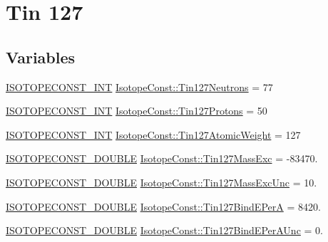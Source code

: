\hypertarget{group___isotope_const-_tin-_sn127}{}\section{Tin 127}
\label{group___isotope_const-_tin-_sn127}
\subsection*{Variables}
\begin{DoxyCompactItemize}
\item 
\mbox{\hyperlink{group___isotope_const-_macros_ga5f18360b3e99483a35c32d789e62621c}{I\+S\+O\+T\+O\+P\+E\+C\+O\+N\+S\+T\+\_\+\+I\+NT}} \mbox{\hyperlink{group___isotope_const-_tin-_sn127_ga81f1b0bce1cccc58d281ed7a2bd7276e}{Isotope\+Const\+::\+Tin127\+Neutrons}} = 77
\item 
\mbox{\hyperlink{group___isotope_const-_macros_ga5f18360b3e99483a35c32d789e62621c}{I\+S\+O\+T\+O\+P\+E\+C\+O\+N\+S\+T\+\_\+\+I\+NT}} \mbox{\hyperlink{group___isotope_const-_tin-_sn127_gae1f20228102f5a677f08bf3c593258c4}{Isotope\+Const\+::\+Tin127\+Protons}} = 50
\item 
\mbox{\hyperlink{group___isotope_const-_macros_ga5f18360b3e99483a35c32d789e62621c}{I\+S\+O\+T\+O\+P\+E\+C\+O\+N\+S\+T\+\_\+\+I\+NT}} \mbox{\hyperlink{group___isotope_const-_tin-_sn127_gaec65ac4d6ffe000b185ed8d26ee21496}{Isotope\+Const\+::\+Tin127\+Atomic\+Weight}} = 127
\item 
\mbox{\hyperlink{group___isotope_const-_macros_ga8f45a7272ce02c0b4c65c44636ed719a}{I\+S\+O\+T\+O\+P\+E\+C\+O\+N\+S\+T\+\_\+\+D\+O\+U\+B\+LE}} \mbox{\hyperlink{group___isotope_const-_tin-_sn127_ga203894618ec16a3ec907ee598004c489}{Isotope\+Const\+::\+Tin127\+Mass\+Exc}} = -\/83470.
\item 
\mbox{\hyperlink{group___isotope_const-_macros_ga8f45a7272ce02c0b4c65c44636ed719a}{I\+S\+O\+T\+O\+P\+E\+C\+O\+N\+S\+T\+\_\+\+D\+O\+U\+B\+LE}} \mbox{\hyperlink{group___isotope_const-_tin-_sn127_ga223b64a9a1fed5db23e75452f06ca7f2}{Isotope\+Const\+::\+Tin127\+Mass\+Exc\+Unc}} = 10.
\item 
\mbox{\hyperlink{group___isotope_const-_macros_ga8f45a7272ce02c0b4c65c44636ed719a}{I\+S\+O\+T\+O\+P\+E\+C\+O\+N\+S\+T\+\_\+\+D\+O\+U\+B\+LE}} \mbox{\hyperlink{group___isotope_const-_tin-_sn127_ga43c243bd35ada3eb7e29ceeedccea79a}{Isotope\+Const\+::\+Tin127\+Bind\+E\+PerA}} = 8420.
\item 
\mbox{\hyperlink{group___isotope_const-_macros_ga8f45a7272ce02c0b4c65c44636ed719a}{I\+S\+O\+T\+O\+P\+E\+C\+O\+N\+S\+T\+\_\+\+D\+O\+U\+B\+LE}} \mbox{\hyperlink{group___isotope_const-_tin-_sn127_gac90e763386810e8ed3e094e885ed300c}{Isotope\+Const\+::\+Tin127\+Bind\+E\+Per\+A\+Unc}} = 0.

\end{DoxyCompactItemize}
